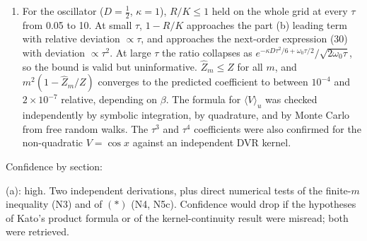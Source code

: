 \documentclass[11pt,a4paper]{article}
\begin{document}
\begin{enumerate}
  The Coulomb potential \(-q^2/r\) in \(d=3\) is not bounded below, so (a) does not apply directly. One needs a self-adjoint, bounded-below \(H\) (Kato's theorem), a regularization satisfying (a), and removal of the regulator on both sides. I used \(V_N=\max(-q^2/r,-N)\). The left side converges by strong resolvent convergence (\(H^2\) is a common core, and \(\|(H_N-H)\phi\|\to0\) for \(\phi\in H^2\)) together with the bounded functional calculus under a uniform lower bound. The right side converges by the monotone convergence theorem applied three times, and the limit is finite because \(\int_0^\tau du\,\langle1/r\rangle_u\le\sqrt{\pi\tau/D}\). The result is (47): \(\langle x|e^{-\tau H}|x'\rangle\ge\rho_0\exp\!\big(q^2\int_0^\tau du\,\operatorname{erf}(|m(u)|/\sqrt2\sigma_u)/|m(u)|\big)\), valid for all \(x,x'\). The error estimate of (b) does not apply: \(V\) is not smooth at the origin, the coefficient \(q^4\langle r^{-4}\rangle_\beta\) diverges for any state with nonzero density at the origin, and within \(\sqrt{D\tau}\) of the origin the local defect is \(O(q^4\tau/D)\) (48) rather than \(O(\tau^3)\). A heuristic, not derived, suggests an \(m^{-3/2}\) law in a confined setting (49). On \(L^2(\mathbb R^3)\) the trace itself is infinite, so the trace-level statement is vacuous there.
\item
  For the oscillator (\(D=\tfrac12\), \(\kappa=1\)), \(R/K\le1\) held on the whole grid at every \(\tau\) from 0.05 to 10. At small \(\tau\), \(1-R/K\) approaches the part (b) leading term with relative deviation \(\propto\tau\), and approaches the next-order expression (30) with deviation \(\propto\tau^2\). At large \(\tau\) the ratio collapses as \(e^{-\kappa D\tau^2/6+\omega_0\tau/2}/\sqrt{2\omega_0\tau}\), so the bound is valid but uninformative. \(\hat Z_m\le Z\) for all \(m\), and \(m^2(1-\hat Z_m/Z)\) converges to the predicted coefficient to between \(10^{-4}\) and \(2\times10^{-7}\) relative, depending on \(\beta\). The formula for \(\langle V\rangle_u\) was checked independently by symbolic integration, by quadrature, and by Monte Carlo from free random walks. The \(\tau^3\) and \(\tau^4\) coefficients were also confirmed for the non-quadratic \(V=\cos x\) against an independent DVR kernel.
\end{enumerate}

Confidence by section:

(a): high. Two independent derivations, plus direct numerical tests of the finite-\(m\) inequality (N3) and of \((\ast)\) (N4, N5c). Confidence would drop if the hypotheses of Kato's product formula or of the kernel-continuity result were misread; both were retrieved.
\end{document}
